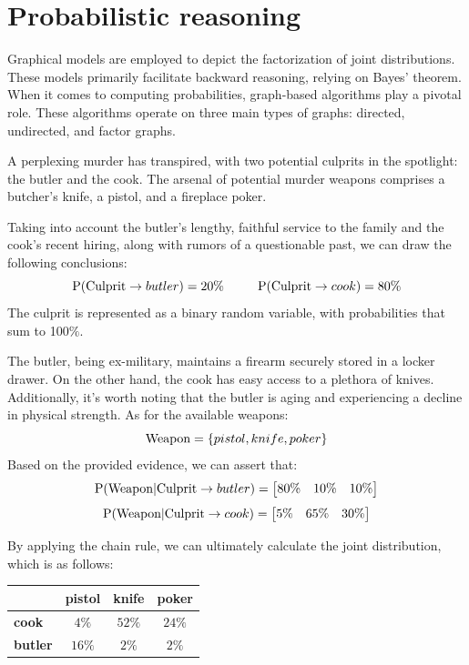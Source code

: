 \documentclass[12pt, a4paper]{report}
\begin{document}
    \section{Probabilistic reasoning}
    Graphical models are employed to depict the factorization of joint distributions. 
    These models primarily facilitate backward reasoning, relying on Bayes' theorem. 
    When it comes to computing probabilities, graph-based algorithms play a pivotal role. 
    These algorithms operate on three main types of graphs: directed, undirected, and factor graphs.
    \begin{example}
        A perplexing murder has transpired, with two potential culprits in the spotlight: the butler and the cook. 
        The arsenal of potential murder weapons comprises a butcher's knife, a pistol, and a fireplace poker.

        Taking into account the butler's lengthy, faithful service to the family and the cook's recent hiring, along with rumors of a questionable past, we can draw the following conclusions:
        \[\textnormal{P}(\textnormal{Culprit}\rightarrow butler)=20\% \:\:\:\:\:\:\:\:\:\:\:\: \textnormal{P}(\textnormal{Culprit}\rightarrow cook)=80\%\]
        The culprit is represented as a binary random variable, with probabilities that sum to 100$\%$.

        The butler, being ex-military, maintains a firearm securely stored in a locker drawer. 
        On the other hand, the cook has easy access to a plethora of knives. 
        Additionally, it's worth noting that the butler is aging and experiencing a decline in physical strength. 
        As for the available weapons:        
        \[\textnormal{Weapon}=\{pistol,knife,poker\}\]
        Based on the provided evidence, we can assert that:
        \[\textnormal{P}(\textnormal{Weapon}|\textnormal{Culprit}\rightarrow butler)=\begin{bmatrix} 80\% & 10\% & 10\% \end{bmatrix}\]
        \[\textnormal{P}(\textnormal{Weapon}|\textnormal{Culprit}\rightarrow cook)=\begin{bmatrix} 5\% & 65\% & 30\% \end{bmatrix}\]
        
        By applying the chain rule, we can ultimately calculate the joint distribution, which is as follows:
        \begin{table}[H]
            \centering
            \begin{tabular}{c|ccc|}
            \cline{2-4}
                                                  & \textbf{pistol} & \textbf{knife} & \textbf{poker} \\ \hline
            \multicolumn{1}{|l|}{\textbf{cook}}   & $4\%$           & $52\%$         & $24\%$         \\
            \multicolumn{1}{|l|}{\textbf{butler}} & $16\%$          & $2\%$          & $2\%$          \\ \hline
            \end{tabular}
        \end{table}


\end{example}
\end{document}
